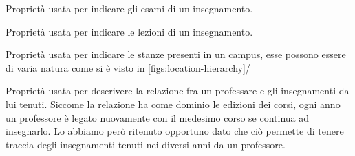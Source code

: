 \begin{itemize}
    {Proprietà usata per indicare gli esami di un insegnamento.}
    
    {Proprietà usata per indicare le lezioni di un insegnamento.}

    {Proprietà usata per indicare le stanze presenti in un campus, esse possono essere di varia natura come si è visto in \cref{figs:location-hierarchy}/}

    {Proprietà usata per descrivere la relazione fra un professare e gli insegnamenti da lui tenuti. Siccome la relazione ha come dominio le edizioni dei corsi, ogni anno un professore è legato nuovamente con il medesimo corso se continua ad insegnarlo. Lo abbiamo però ritenuto opportuno dato che ciò permette di tenere traccia degli insegnamenti tenuti nei diversi anni da un professore.}

\end{itemize}


